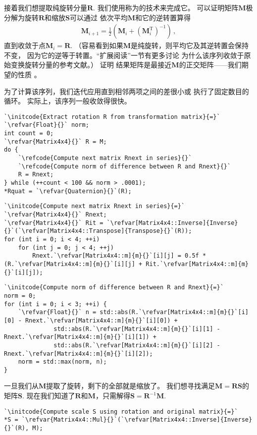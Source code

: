 接着我们想提取纯旋转分量$\bm R$.
我们使用称为的技术来完成它。
可以证明矩阵$\bm M$极分解为旋转$\bm R$和缩放$\bm S$可以通过
依次平均$\bm M$和它的逆转置算得
\begin{align}\label{eq:2.10}
    \bm M_{i+1}=\frac{1}{2}(\bm M_i+(\bm M_i^\mathrm{T})^{-1})\, ,
\end{align}
直到收敛于点$\bm M_i=\bm R$.
（容易看到如果$\bm M$是纯旋转，则平均它及其逆转置会保持不变，
因为它的逆等于转置。“扩展阅读”一节有更多讨论
为什么该序列收敛于原始变换旋转分量的参考文献。）
\citet{10.5555/155294.155324}证明
结果矩阵是最接近$\bm M$的正交矩阵——我们期望的性质
。

为了计算该序列，我们迭代应用直到相邻两项之间的差很小或
执行了固定数目的循环。
实际上，该序列一般收敛得很快。
\begin{lstlisting}
`\initcode{Extract rotation R from transformation matrix}{=}`
`\refvar{Float}{}` norm;
int count = 0;
`\refvar{Matrix4x4}{}` R = M;
do {
    `\refcode{Compute next matrix Rnext in series}{}`
    `\refcode{Compute norm of difference between R and Rnext}{}`
    R = Rnext;
} while (++count < 100 && norm > .0001);
*Rquat = `\refvar{Quaternion}{}`(R);
\end{lstlisting}
\begin{lstlisting}
`\initcode{Compute next matrix Rnext in series}{=}`
`\refvar{Matrix4x4}{}` Rnext;
`\refvar{Matrix4x4}{}` Rit = `\refvar[Matrix4x4::Inverse]{Inverse}{}`(`\refvar[Matrix4x4::Transpose]{Transpose}{}`(R));
for (int i = 0; i < 4; ++i)
    for (int j = 0; j < 4; ++j)
        Rnext.`\refvar[Matrix4x4::m]{m}{}`[i][j] = 0.5f * (R.`\refvar[Matrix4x4::m]{m}{}`[i][j] + Rit.`\refvar[Matrix4x4::m]{m}{}`[i][j]);
\end{lstlisting}
\begin{lstlisting}
`\initcode{Compute norm of difference between R and Rnext}{=}`
norm = 0;
for (int i = 0; i < 3; ++i) {
    `\refvar{Float}{}` n = std::abs(R.`\refvar[Matrix4x4::m]{m}{}`[i][0] - Rnext.`\refvar[Matrix4x4::m]{m}{}`[i][0]) + 
              std::abs(R.`\refvar[Matrix4x4::m]{m}{}`[i][1] - Rnext.`\refvar[Matrix4x4::m]{m}{}`[i][1]) + 
              std::abs(R.`\refvar[Matrix4x4::m]{m}{}`[i][2] - Rnext.`\refvar[Matrix4x4::m]{m}{}`[i][2]);
    norm = std::max(norm, n);
}
\end{lstlisting}

一旦我们从$\bm M$提取了旋转，剩下的全部就是缩放了。
我们想寻找满足$\bm M=\bm R\bm S$的矩阵$\bm S$.
现在我们知道了$\bm R$和$\bm M$，只需解得$\bm S=\bm R^{-1}\bm M$.
\begin{lstlisting}
`\initcode{Compute scale S using rotation and original matrix}{=}`
*S = `\refvar{Matrix4x4::Mul}{}`(`\refvar[Matrix4x4::Inverse]{Inverse}{}`(R), M);
\end{lstlisting}

